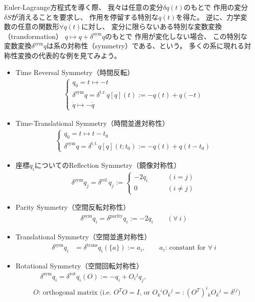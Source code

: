 Euler-Lagrange方程式を導く際、
我々は任意の変分$\delta q(t)$のもとで
作用の変分$\delta S$が消えることを要求し、
作用を停留する特別な$q(t)$を得た。
逆に、力学変数の任意の関数形$\forall q(t)$に対し、
変分に限らないある特別な変数変換（transformation）
$q \mapsto q + \delta^{\mathrm{sym}} q$のもとで
作用が変化しない場合、
この特別な変数変換$\delta^{\mathrm{sym}} q$は系の対称性（symmetry）である、という。
多くの系に現れる対称性変換の代表的な例を見てみよう。
\begin{itemize}
  \item{Time Reversal Symmetry（時間反転）}
  \begin{align}
    \begin{cases}
      q_0 = t \mapsto -t
      \\
      \delta^{\mathrm{sym}} q
      =
      \delta^{\mathrm{t.r.}} q [q](t)
      := -q(t) + q(-t)
      \\
      \dot{q} \mapsto -\dot{q}
    \end{cases}
  \end{align}
  \item {Time-Translational Symmetry（時間並進対称性）}
  \begin{align}
    \begin{cases}
      q_0 = t \mapsto t - t_0
      \\
      \delta^{\mathrm{sym}} q
      =
      \delta^{\mathrm{t.t.}} q[q](t; t_0)
      := -q(t) + q(t-t_0)
    \end{cases}
  \label{time translation}
  \end{align}
  \item {座標$q_i$についてのReflection Symmetry（鏡像対称性）}
  \begin{align}
    \delta^{\mathrm{sym}} q_j
    =
    \delta^{\mathrm{ref.}} q_j
    :=
    \begin{cases}
    - 2 q_i
    \qquad &(i = j)
    \\
    0
    \qquad &(i\neq j)
    \end{cases}
  \end{align}
  \item {Parity Symmetry（空間反転対称性）}
  \begin{align}
      \delta^{\mathrm{sym}} q_i
      =
      \delta^{\mathrm{parity}} q_i
      := - 2 q_i
  \qquad
  (\forall\ i)
  \end{align}
  \item {Translational Symmetry（空間並進対称性）}
  \begin{align}
    \delta^{\mathrm{sym}} q_i
    &=
    \delta^{\mathrm{trans}}q_i (\{a\} )
    := a_i
    ,\qquad\text{$a_i$: constant for $\forall\ i$}
  \end{align}
  \item {Rotational Symmetry（空間回転対称性）}
  \begin{align}
    &\quad\delta^{\mathrm{sym}} q_i
    =
    \delta^{\mathrm{rot}}q_i ( O )
    := -q_i + O_i{}^j q_j
    ,\\
    &\text{$O$: orthogonal matrix
    (i.e.
      $O^T O = I$, or
      $O_k{}^i O_k{}^j
      =:
      (O^T)^i{}_k O_k{}^j
      =
      \delta^{ij}$)}
  \end{align}
\end{itemize}
